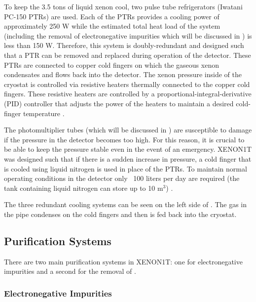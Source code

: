  To keep the 3.5 tons of liquid xenon cool, two pulse tube refrigerators (Iwatani PC-150 PTRs) are used.  Each of the PTRs provides a cooling power of approximately 250 W while the estimated total heat load of the system (including the removal of electronegative impurities which will be discussed in ) is less than 150 W.  Therefore, this system is doubly-redundant and designed such that a PTR can be removed and replaced during operation of the detector.  These PTRs are connected to copper cold fingers on which the gaseous xenon condensates and flows back into the detector.  The xenon pressure inside of the cryostat is controlled via resistive heaters thermally connected to the copper cold fingers.  These resistive heaters are  controlled by a proportional-integral-derivative (PID) controller that adjusts the power of the heaters to maintain a desired cold-finger temperature \cite{aprile2017xenon1t}.
 
 The photomultiplier tubes (which will be discussed in ) are susceptible to damage if the pressure in the detector becomes too high.  For this reason, it is crucial to be able to keep the pressure stable even in the event of an emergency.  XENON1T was designed such that if there is a sudden increase in pressure, a cold finger that is cooled using liquid nitrogen is used in place of the PTRs.  To maintain normal operating conditions in the detector only ~100 liters per day are required (the tank containing liquid nitrogen can store up to 10 $\textrm{m}^3$) \cite{aprile2017xenon1t}.
 
 The three redundant cooling systems can be seen on the left side of .  The gas in the pipe condenses on the cold fingers and then is fed back into the cryostat.

 
 \subsection{Purification Systems}
 \label{sec:xe1t_pur}
 
 There are two main purification systems in XENON1T: one for electronegative impurities and a second for the removal of .  
 
 \subsubsection{Electronegative Impurities}
 \label{sec:xe1t_pur_electronegative}
 
